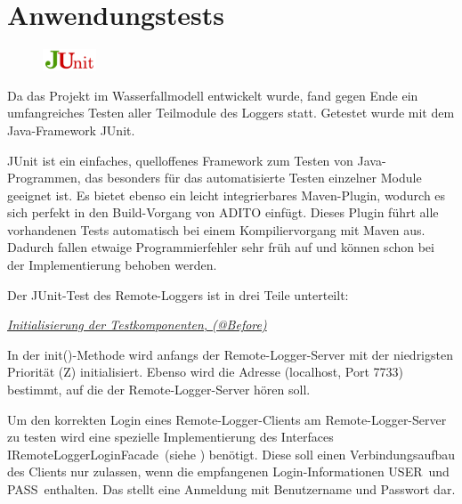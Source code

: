\section{Anwendungstests}
\begin{figure}
	\vspace{-17px} \hspace{5px}
	\includegraphics[width=60px]{../img/junit-logo}
	\caption[JUnit-Logo]{}
\end{figure}
\par Da das Projekt im Wasserfallmodell entwickelt wurde, fand gegen Ende ein umfangreiches Testen aller Teilmodule des Loggers statt. Getestet wurde mit dem Java-Framework \glqq JUnit\grqq.
\par JUnit ist ein einfaches, quelloffenes Framework zum Testen von Java-Programmen, das besonders für das automatisierte Testen einzelner Module geeignet ist. Es bietet ebenso ein leicht integrierbares Maven-Plugin, wodurch es sich perfekt in den Build-Vorgang von ADITO einfügt. Dieses Plugin führt alle vorhandenen Tests automatisch bei einem Kompiliervorgang mit Maven aus. Dadurch fallen etwaige Programmierfehler sehr früh auf und können schon bei der Implementierung behoben werden.
\par Der JUnit-Test des Remote-Loggers ist in drei Teile unterteilt:

\par \textit{\underline{Initialisierung der Testkomponenten, (@Before)}}
\vspace{8px}

In der \glqq init()\grqq-Methode wird anfangs der Remote-Logger-Server mit der niedrigsten Priorität (Z) initialisiert. Ebenso wird die Adresse (localhost, Port 7733) bestimmt, auf die der Remote-Logger-Server hören soll.

\vspace{10px}

Um den korrekten Login eines Remote-Logger-Clients am Remote-Logger-Server zu testen wird eine spezielle Implementierung des Interfaces \glqq IRemoteLoggerLoginFacade\grqq\ (siehe ) benötigt. Diese soll einen Verbindungsaufbau des Clients nur zulassen, wenn die empfangenen Login-Informationen \glqq USER\grqq\ und \glqq PASS\grqq\ enthalten. Das stellt eine Anmeldung mit Benutzername und Passwort dar.

